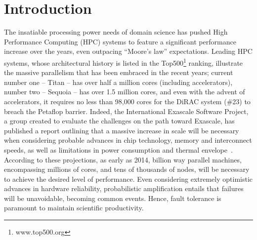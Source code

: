 \section{Introduction}

The insatiable processing power needs of domain science has pushed High
Performance Computing (HPC) systems to feature a significant
performance increase over the years, even outpacing ``Moore's law''
expectations. Leading HPC systems, whose architectural history is listed
in the Top500\footnote{www.top500.org} ranking, illustrate the massive
parallelism that has been embraced in the recent years;
current number one -- Titan -- has over half a million cores (including accelerators), 
number two -- Sequoia -- has over 1.5 million cores, and even with
the advent of accelerators, it requires no less than 98,000
cores for the DiRAC system (\#23) to breach the Petaflop
barrier. Indeed, the International Exascale Software Project, a group
created to evaluate the challenges on the path toward Exascale, has 
published a 
report outlining that a massive
increase in scale will be necessary when considering probable advances
in chip technology, memory and interconnect speeds, as well as
limitations in power consumption and thermal envelope~\cite{iesp}.
According to these projections, as early as 2014, billion way parallel
machines, encompassing millions of cores, and tens of
thousands of nodes, will be necessary to achieve the desired level of
performance. Even considering extremely optimistic advances in hardware
reliability, probabilistic amplification entails that failures will be
unavoidable, becoming common events. Hence, fault tolerance is paramount
to maintain scientific productivity.

